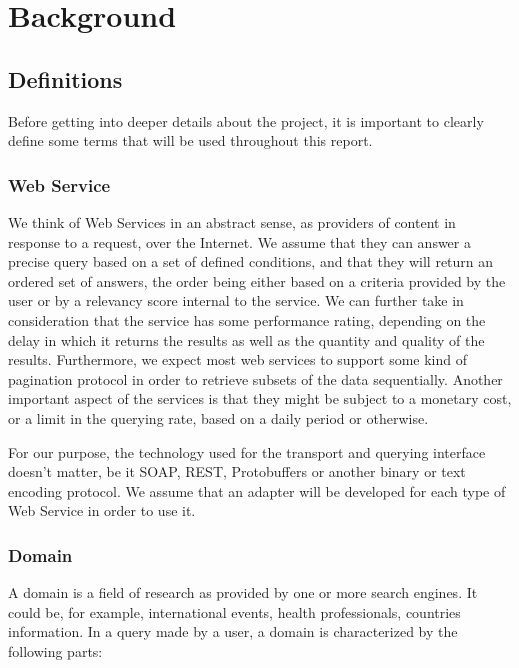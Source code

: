 \chapter{Background} %
\label{cha:background}

\section{Definitions} %
\label{sec:definitions}

Before getting into deeper details about the project, it is important to clearly define some terms that will be used throughout this report.

\subsection{Web Service} %
\label{sub:web_service_def}

We think of Web Services in an abstract sense, as providers of content in response to a request, over the Internet. We assume that they can answer a precise query based on a set of defined conditions, and that they will return an ordered set of answers, the order being either based on a criteria provided by the user or by a relevancy score internal to the service. We can further take in consideration that the service has some performance rating, depending on the delay in which it returns the results as well as the quantity and quality of the results. Furthermore, we expect most web services to support some kind of pagination protocol in order to retrieve subsets of the data sequentially. Another important aspect of the services is that they might be subject to a monetary cost, or a limit in the querying rate, based on a daily period or otherwise.

For our purpose, the technology used for the transport and querying interface doesn't matter, be it SOAP, REST, Protobuffers or another binary or text encoding protocol. We assume that an adapter will be developed for each type of Web Service in order to use it.


\subsection{Domain} %
\label{sub:domain_def}

A domain is a field of research as provided by one or more search engines. It could be, for example, international events, health professionals, countries information. In a query made by a user, a domain is characterized by the following parts:

